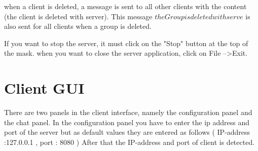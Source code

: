 \noindent
when a client is deleted, a message is sent to all other clients with the content
(the client is deleted with server).
This message \(the Group is deleted with serve\) is also sent for all clients when a group is deleted.
\medskip

\noindent
If you want to stop the server, it must click on the "Stop" button at the top of the mask.
when you want to close the server application, click on File -->Exit.

\section {Client GUI}\label{sec:client-gui}
There are two panels in the client interface, namely the configuration panel and the chat panel.
In the configuration panel you have to enter the ip address and port of the server but as default
values they are entered as follows ( IP-address :127.0.0.1 , port : 8080 ) After that the
IP-address and port of client is detected.
\medskip

